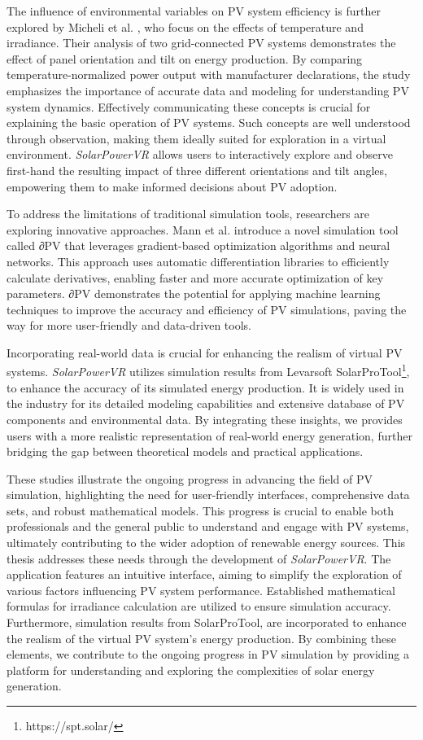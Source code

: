 \documentclass[draft, final]{vutinfth} %
\begin{document}
The influence of environmental variables on PV system efficiency is further explored by Micheli et al. \cite{Micheli2014OutdoorPerformance}, who focus on the effects of temperature and irradiance. Their analysis of two grid-connected PV systems demonstrates the effect of panel orientation and tilt on energy production. By comparing temperature-normalized power output with manufacturer declarations, the study emphasizes the importance of accurate data and modeling for understanding PV system dynamics. Effectively communicating these concepts is crucial for explaining the basic operation of PV systems. Such concepts are well understood through observation, making them ideally suited for exploration in a virtual environment. \textit{SolarPowerVR} allows users to interactively explore and observe first-hand the resulting impact of three different orientations and tilt angles, empowering them to make informed decisions about PV adoption.

To address the limitations of traditional simulation tools, researchers are exploring innovative approaches. Mann et al. \cite{Mann2022deltaPV} introduce a novel simulation tool called ∂PV that leverages gradient-based optimization algorithms and neural networks. This approach uses automatic differentiation libraries to efficiently calculate derivatives, enabling faster and more accurate optimization of key parameters. ∂PV demonstrates the potential for applying machine learning techniques to improve the accuracy and efficiency of PV simulations, paving the way for more user-friendly and data-driven tools.


Incorporating real-world data is crucial for enhancing the realism of virtual PV systems. \textit{SolarPowerVR} utilizes simulation results from Levarsoft SolarProTool\footnote{https://spt.solar/}, to enhance the accuracy of its simulated energy production. It is widely used in the industry for its detailed modeling capabilities and extensive database of PV components and environmental data. By integrating these insights, we provides users with a more realistic representation of real-world energy generation, further bridging the gap between theoretical models and practical applications.

These studies illustrate the ongoing progress in advancing the field of PV simulation, highlighting the need for user-friendly interfaces, comprehensive data sets, and robust mathematical models. This progress is crucial to enable both professionals and the general public to understand and engage with PV systems, ultimately contributing to the wider adoption of renewable energy sources. This thesis addresses these needs through the development of \textit{SolarPowerVR}. The application features an intuitive interface, aiming to simplify the exploration of various factors influencing PV system performance. Established mathematical formulas for irradiance calculation are utilized to ensure simulation accuracy. Furthermore, simulation results from SolarProTool, are incorporated to enhance the realism of the virtual PV system's energy production. By combining these elements, we contribute to the ongoing progress in PV simulation by providing a platform for understanding and exploring the complexities of solar energy generation.
\end{document}
